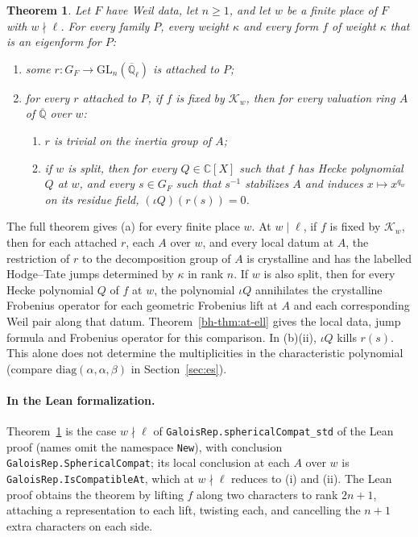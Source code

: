 \documentclass[reqno]{amsart}
\theoremstyle{definition}
\theoremstyle{plain}
\newtheorem{theorem}{Theorem}[section]
\newcommand{\Q}{\mathbb{Q}}
\newcommand{\C}{\mathbb{C}}
\newcommand{\Qlb}{\overline{\Q}_\ell}
\newcommand{\Kc}{\mathcal{K}}
\newcommand{\GL}{\mathrm{GL}}
\begin{document}
\begin{theorem}\label{thm:spherical}
Let \(F\) have Weil data, let \(n \ge 1\), and let \(w\) be a finite place of \(F\) with \(w \nmid \ell\).  For every family \(P\), every weight \(\kappa\) and every form \(f\) of weight \(\kappa\) that is an eigenform for \(P\):
\begin{enumerate}
\item[(a)] some \(r \colon G_F \to \GL_n(\Qlb)\) is attached to \(P\);
\item[(b)] for every \(r\) attached to \(P\), if \(f\) is fixed by \(\Kc_w\), then for every valuation ring \(A\) of \(\overline{\Q}\) over \(w\):
\begin{enumerate}
\item[(i)] \(r\) is trivial on the inertia group of \(A\);
\item[(ii)] if \(w\) is split, then for every \(Q \in \C[X]\) such that \(f\) has Hecke polynomial \(Q\) at \(w\), and every \(s \in G_F\) such that \(s^{-1}\) stabilizes \(A\) and induces \(x \mapsto x^{q_w}\) on its residue field, \((\iota Q)(r(s)) = 0\).
\end{enumerate}
\end{enumerate}
\end{theorem}

The full theorem gives (a) for every finite place \(w\).  At \(w \mid \ell\), if \(f\) is fixed by \(\Kc_w\), then for each attached \(r\), each \(A\) over \(w\), and every local datum at \(A\), the restriction of \(r\) to the decomposition group of \(A\) is crystalline and has the labelled Hodge--Tate jumps determined by \(\kappa\) in rank \(n\).  If \(w\) is also split, then for every Hecke polynomial \(Q\) of \(f\) at \(w\), the polynomial \(\iota Q\) annihilates the crystalline Frobenius operator for each geometric Frobenius lift at \(A\) and each corresponding Weil pair along that datum.  Theorem~\ref{bh-thm:at-ell} gives the local data, jump formula and Frobenius operator for this comparison.  In (b)(ii), \(\iota Q\) kills \(r(s)\).  This alone does not determine the multiplicities in the characteristic polynomial (compare \(\mathrm{diag}(\alpha,\alpha,\beta)\) in Section~\ref{sec:es}).

\paragraph{In the Lean formalization.}  Theorem~\ref{thm:spherical} is the case \(w \nmid \ell\) of \texttt{GaloisRep.sphericalCompat\_std} of the Lean proof \cite{GL} (names omit the namespace \texttt{New}), with conclusion \texttt{GaloisRep.SphericalCompat}; its local conclusion at each \(A\) over \(w\) is \texttt{GaloisRep.IsCompatibleAt}, which at \(w \nmid \ell\) reduces to (i) and (ii).  The Lean proof obtains the theorem by lifting \(f\) along two characters to rank \(2n+1\), attaching a representation to each lift, twisting each, and cancelling the \(n+1\) extra characters on each side.
\end{document}
